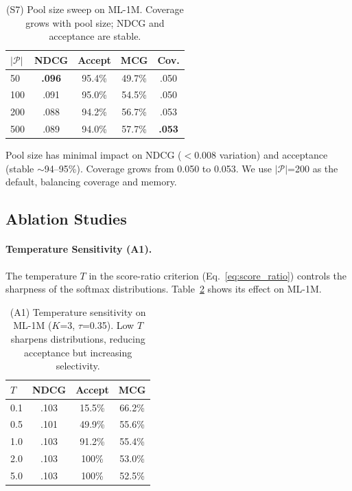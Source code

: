 \documentclass[sigconf,nonacm=false]{acmart}
\begin{document}
\begin{table}[t]
\centering
\caption{(S7) Pool size sweep on ML-1M. Coverage grows with pool size; NDCG and acceptance are stable.}
\label{tab:s7}
\small
\begin{tabular}{lcccc}
\toprule
$|\mathcal{P}|$ & NDCG & Accept & MCG & Cov. \\
\midrule
50 & \textbf{.096} & 95.4\% & 49.7\% & .050 \\
100 & .091 & 95.0\% & 54.5\% & .050 \\
\rowcolor{gray!15}
200 & .088 & 94.2\% & 56.7\% & .053 \\
500 & .089 & 94.0\% & 57.7\% & \textbf{.053} \\
\bottomrule
\end{tabular}
\end{table}

Pool size has minimal impact on NDCG ($<$0.008 variation) and acceptance (stable $\sim$94--95\%). Coverage grows from 0.050 to 0.053. We use $|\mathcal{P}|$=200 as the default, balancing coverage and memory.

\subsection{Ablation Studies}
\label{sec:ablation}

\paragraph{Temperature Sensitivity (A1).}
The temperature $T$ in the score-ratio criterion (Eq.~\ref{eq:score_ratio}) controls the sharpness of the softmax distributions. Table~\ref{tab:a1} shows its effect on ML-1M.

\begin{table}[t]
\centering
\caption{(A1) Temperature sensitivity on ML-1M ($K$=3, $\tau$=0.35). Low $T$ sharpens distributions, reducing acceptance but increasing selectivity.}
\label{tab:a1}
\small
\begin{tabular}{lccc}
\toprule
$T$ & NDCG & Accept & MCG \\
\midrule
0.1 & .103 & 15.5\% & 66.2\% \\
0.5 & .101 & 49.9\% & 55.6\% \\
\rowcolor{gray!15}
1.0 & .103 & 91.2\% & 55.4\% \\
2.0 & .103 & 100\% & 53.0\% \\
5.0 & .103 & 100\% & 52.5\% \\
\bottomrule
\end{tabular}
\end{table}
\end{document}
